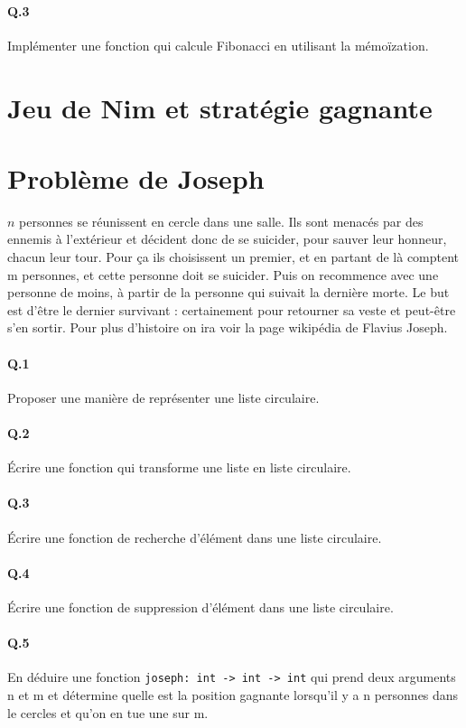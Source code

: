 \documentclass[10pt,a4paper]{article}
\begin{document}
\paragraph{Q.3} Implémenter une fonction qui calcule Fibonacci en utilisant la mémoïzation.
 

\section{Jeu de Nim et stratégie gagnante}

\section{Problème de Joseph}
$n$ personnes se réunissent en cercle dans une salle. Ils sont menacés par des ennemis à l'extérieur et décident donc de se suicider, pour sauver leur honneur, chacun leur tour. Pour ça ils choisissent un premier, et en partant de là comptent m personnes, et cette personne doit se suicider. Puis on recommence avec une personne de moins, à partir de la personne qui suivait la dernière morte. Le but est d'être le dernier survivant : certainement pour retourner sa veste et peut-être s'en sortir. Pour plus d'histoire on ira voir la page wikipédia de Flavius Joseph.

\paragraph{Q.1} Proposer une manière de représenter une liste circulaire. 

\paragraph{Q.2} Écrire une fonction qui transforme une liste en liste circulaire.

\paragraph{Q.3} Écrire une fonction de recherche d'élément dans une liste circulaire.

\paragraph{Q.4} Écrire une fonction de suppression d'élément dans une liste circulaire.

\paragraph{Q.5} En déduire une fonction \texttt{joseph: int -> int -> int} qui prend deux arguments n et m et détermine quelle est la position gagnante
lorsqu'il y a n personnes dans le cercles et qu'on en tue une sur m.
\end{document}
